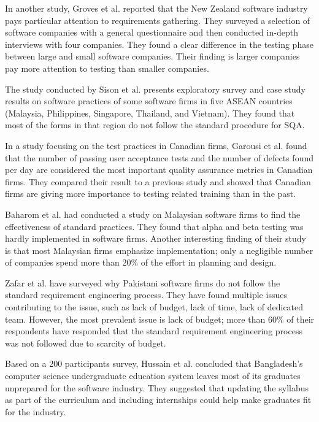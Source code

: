 In another study, Groves et al.\cite{Groves2000} reported that the New Zealand software industry pays particular attention to requirements gathering. They surveyed a selection of software companies with a general questionnaire and then conducted in-depth interviews with four companies. They found a clear difference in the testing phase between large and small software companies. Their finding is larger companies pay more attention to testing than smaller companies.

The study conducted by Sison et al.\cite{Sison2006} presents exploratory survey and case study results on software practices of some software firms in five ASEAN countries (Malaysia, Philippines, Singapore, Thailand, and Vietnam). They found that most of the forms in that region do not follow the standard procedure for SQA.

In a study focusing on the test practices in Canadian firms, Garousi et al.\cite{Garousi2013} found that the number of passing user acceptance tests and the number of defects found per day are considered the most important quality assurance metrics in Canadian firms. They compared their result to a previous study and showed that Canadian firms are giving more importance to testing related training than in the past.

Baharom et al.\cite{Baharom2006} had conducted a study on Malaysian software firms to find the effectiveness of standard practices. They found that alpha and beta testing was hardly implemented in software firms. Another interesting finding of their study is that most Malaysian firms emphasize implementation; only a  negligible number of companies spend more than 20\% of the effort in planning and design.

Zafar et al.\cite{Zafar2018} have surveyed why Pakistani software firms do not follow the standard requirement engineering process. They have found multiple issues contributing to the issue, such as lack of budget, lack of time, lack of dedicated team. However, the most prevalent issue is lack of budget; more than 60\% of their respondents have responded that the standard requirement engineering process was not followed due to scarcity of budget.

Based on a 200 participants survey, Hussain et al.\cite{Hussain2020} concluded that Bangladesh's computer science undergraduate education system leaves most of its graduates unprepared for the software industry. They suggested that updating the syllabus as part of the curriculum and including internships could help make graduates fit for the industry.

